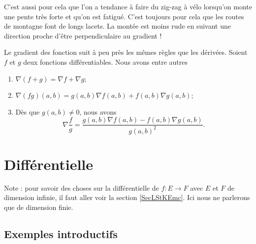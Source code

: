 C'est aussi pour cela que l'on a tendance à faire du zig-zag à vélo lorsqu'on monte une pente très forte et qu'on est fatigué. C'est toujours pour cela que les routes de montagne font de longs lacets. La montée est moins rude en suivant une direction proche d'être perpendiculaire au gradient !

\begin{theorem}
    Le gradient des fonction suit à peu près les mêmes règles que les dérivées. Soient $f$ et $g$ deux fonctions différentiables. Nous avons entre autres
    \begin{enumerate}
        \item
            $\nabla(f+g)=\nabla f+\nabla g$;
        \item
            $\nabla(fg)(a,b)=g(a,b)\nabla f(a,b)+f(a,b)\nabla g(a,b)$;
        \item
            Dès que $g(a,b)\neq 0$, nous avons
            \begin{equation}
                \nabla\frac{ f }{ g }=\frac{ g(a,b)\nabla f(a,b)-f(a,b)\nabla g(a,b) }{ g(a,b)^2 }.
            \end{equation}
    \end{enumerate}
\end{theorem}


\section{Différentielle}

Note : pour savoir des choses sur la différentielle de \( f\colon E\to F\) avec \( E\) et \( F\) de dimension infinie, il faut aller voir la section \ref{SecLStKEmc}. Ici nous ne parlerons que de dimension finie.

\subsection{Exemples introductifs}

